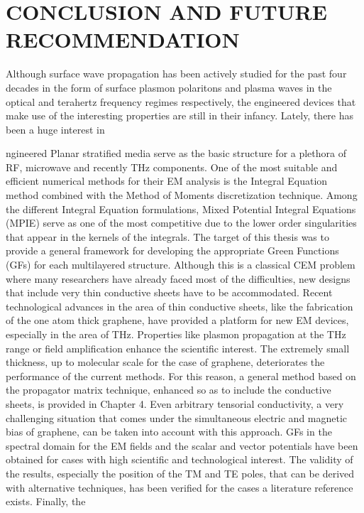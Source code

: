 \chapter{\uppercase {Conclusion and Future recommendation}}

Although surface wave propagation has been actively studied for the past four decades in the form of surface plasmon polaritons and plasma waves in the optical and terahertz frequency regimes respectively, the engineered devices that make use of the interesting properties are still in their infancy. Lately, there has been a huge interest in  

ngineered
Planar stratified media serve as the basic structure for a plethora of RF, microwave and
recently THz components. One of the most suitable and efficient numerical methods for
their EM analysis is the Integral Equation method combined with the Method of Moments
discretization technique. Among the different Integral Equation formulations, Mixed Potential
Integral Equations (MPIE) serve as one of the most competitive due to the lower order
singularities that appear in the kernels of the integrals.
The target of this thesis was to provide a general framework for developing the appropriate
Green Functions (GFs) for each multilayered structure. Although this is a classical CEM
problem where many researchers have already faced most of the difficulties, new designs that
include very thin conductive sheets have to be accommodated. Recent technological advances
in the area of thin conductive sheets, like the fabrication of the one atom thick graphene,
have provided a platform for new EM devices, especially in the area of THz. Properties like
plasmon propagation at the THz range or field amplification enhance the scientific interest.
The extremely small thickness, up to molecular scale for the case of graphene, deteriorates
the performance of the current methods. For this reason, a general method based on the
propagator matrix technique, enhanced so as to include the conductive sheets, is provided
in Chapter 4. Even arbitrary tensorial conductivity, a very challenging situation that comes
under the simultaneous electric and magnetic bias of graphene, can be taken into account
with this approach. GFs in the spectral domain for the EM fields and the scalar and vector
potentials have been obtained for cases with high scientific and technological interest. The
validity of the results, especially the position of the TM and TE poles, that can be derived with
alternative techniques, has been verified for the cases a literature reference exists. Finally, the

